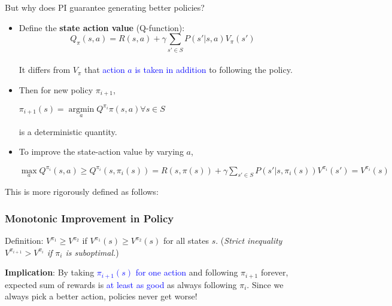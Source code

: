\documentclass{article}
\begin{document}
But why does PI guarantee generating better policies?
\begin{itemize}
\item Define the \textbf{state action value} (Q-function):
    \begin{equation*}
        Q_{\pi} (s, a) = R(s, a) + \gamma \sum_{s' \in S} P(s' | s, a) V_{\pi} (s')
    \end{equation*}
    \\It differs from $V_{\pi}$ that \textcolor{blue}{action $a$ is taken in addition} to following the policy.
\item Then for new policy $\pi_{i+1}$, 
      \begin{center}
          $\pi_{i+1} (s) = \mathop{\arg\min}\limits_{a} Q^{\pi_i}{\pi}(s, a) \forall s \in S$
      \end{center}
      is a deterministic quantity.
\item To improve the state-action value by varying $a$,
      \begin{center}
          $\mathop{\max}\limits_{a} Q^{\pi_i} (s, a) \geq
          Q^{\pi_i} (s, \pi_{i}(s)) = R(s, \pi(s)) + \gamma \sum_{s' \in S} P(s' | s, \pi_i(s)) V^{{\pi}_i} (s')
          = V^{{\pi}_i} (s)
          $
      \end{center}
\end{itemize}

This is more rigorously defined as follows:
\begin{thmbox}
    \subsubsection*{Monotonic Improvement in Policy}
    Definition: $V^{\pi_{1}} \geq V^{\pi_{2}}$ if $V^{\pi_{1}}(s) \geq V^{\pi_{2}}(s)$ for all states $s$.
    (\textit{Strict inequality $V^{\pi_{i+1}} > V^{\pi_{i}}$  if $\pi_{i}$ is suboptimal.})
    \begin{prfbox}
        \textbf{Implication}: By taking \textcolor{blue}{$\pi_{i+1} (s)$ for one action} and following $\pi_{i+1}$ forever, expected sum of rewards is \textcolor{blue}{at least as good} as always following $\pi_{i}$.
        Since we always pick a better action, policies never get worse!
    \end{prfbox}
\end{thmbox}
\end{document}
